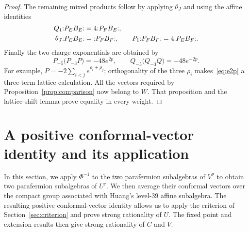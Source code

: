 \documentclass[11pt,reqno]{amsart}
\theoremstyle{definition}\newtheorem{definition}[theorem]{Definition}
\theoremstyle{remark}\newtheorem{remark}[theorem]{Remark}
\newcommand{\nn}[1]{\mathopen{:}#1\mathclose{:}}
\numberwithin{equation}{section}
\begin{document}
\begin{proof}
The remaining mixed products follow by applying $\theta_J$ and using the affine identities
\begin{align}\label{eq:otherPB}
 Q_{1}\nn{P_EB_E}&=4\nn{P_FB_E},\notag\\
 \theta_J\nn{P_EB_E}&=\nn{P_FB_F},\qquad
 P_{1}\nn{P_FB_F}=4\nn{P_EB_F}.
\end{align}
Finally the two charge exponentials are obtained by
\begin{equation}\label{eq:e2p}
 P_{-5}\bigl(P_{-3}P\bigr)=-48e^{2p},\qquad
 Q_{-5}\bigl(Q_{-3}Q\bigr)=-48e^{-2p}.
\end{equation}
For example, $P=-2\sum_{i<j}e^{\rho_i+\rho_j}$; orthogonality of the three $\rho_i$ makes~\eqref{eq:e2p} a three-term lattice calculation. All the vectors required by Proposition~\ref{prop:comparison} now belong to $W$. That proposition and the lattice-shift lemma prove equality in every weight.
\end{proof}

\section{A positive conformal-vector identity and its application}\label{sec:rationality}
In this section, we apply $\Phi^{-1}$ to the two parafermion subalgebras of $V^\sigma$ to obtain two parafermion subalgebras of $U^\tau$. We then average their conformal vectors over the compact group associated with Huang's level-$39$ affine subalgebra. The resulting positive conformal-vector identity allows us to apply the criterion of Section~\ref{sec:criterion} and prove strong rationality of $U$. The fixed point and extension results then give strong rationality of $C$ and $V$.
\end{document}
